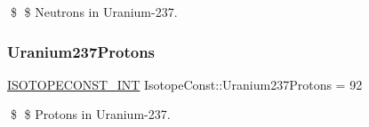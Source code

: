 \$ \$ Neutrons in Uranium-\/237. \mbox{\label{group___isotope_const-_uranium-_u237_ga26c50637f9fd4ec84ffcfd8eaa515884}} 
\subsubsection{\texorpdfstring{Uranium237\+Protons}{Uranium237Protons}}
{\footnotesize\ttfamily \mbox{\hyperlink{group___isotope_const-_macros_ga5f18360b3e99483a35c32d789e62621c}{I\+S\+O\+T\+O\+P\+E\+C\+O\+N\+S\+T\+\_\+\+I\+NT}} Isotope\+Const\+::\+Uranium237\+Protons = 92}

\$ \$ Protons in Uranium-\/237. 